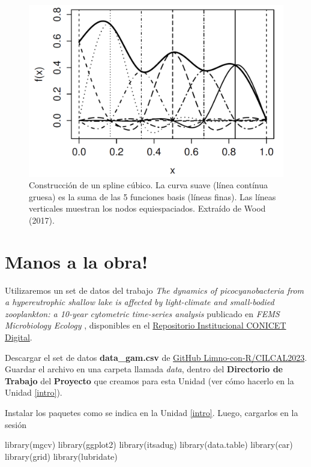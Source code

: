 \documentclass[
]{book}
\newenvironment{Shaded}{\begin{snugshade}}{\end{snugshade}}
\newcommand{\FunctionTok}[1]{\textcolor[rgb]{0.00,0.00,0.00}{#1}}
\newcommand{\NormalTok}[1]{#1}
\begin{document}
\begin{figure}

{\centering \includegraphics[width=0.8\linewidth]{./images/Splines} 

}

\caption{Construcción de un spline cúbico. La curva suave (línea contínua gruesa) es la suma de las 5 funciones basis (líneas finas). Las líneas verticales muestran los nodos equiespaciados. Extraído de Wood (2017).}\label{fig:Splines}
\end{figure}

\hypertarget{manos-a-la-obra}{%
\section{Manos a la obra!}\label{manos-a-la-obra}}

Utilizaremos un set de datos del trabajo \emph{The dynamics of picocyanobacteria from a hypereutrophic shallow lake is affected by light-climate and small-bodied zooplankton: a 10-year cytometric time-series analysis} publicado en \emph{FEMS Microbiology Ecology} \citep{quiroga2021}, disponibles en el \href{http://hdl.handle.net/11336/200094}{Repositorio Institucional CONICET Digital}.

Descargar el set de datos \textbf{data\_gam.csv} de \href{https://github.com/Limno-con-R/CILCAL2023/tree/main/datasets}{GitHub Limno-con-R/CILCAL2023}.
Guardar el archivo en una carpeta llamada \emph{data}, dentro del \textbf{Directorio de Trabajo} del \textbf{Proyecto} que creamos para esta Unidad (ver cómo hacerlo en la Unidad \ref{intro}).

Instalar los paquetes como se indica en la Unidad \ref{intro}. Luego, cargarlos en la sesión

\begin{Shaded}
\begin{Highlighting}[]
\FunctionTok{library}\NormalTok{(mgcv)}
\FunctionTok{library}\NormalTok{(ggplot2)}
\FunctionTok{library}\NormalTok{(itsadug)}
\FunctionTok{library}\NormalTok{(data.table)}
\FunctionTok{library}\NormalTok{(car)}
\FunctionTok{library}\NormalTok{(grid)}
\FunctionTok{library}\NormalTok{(lubridate)}
\end{Highlighting}
\end{Shaded}
\end{document}
